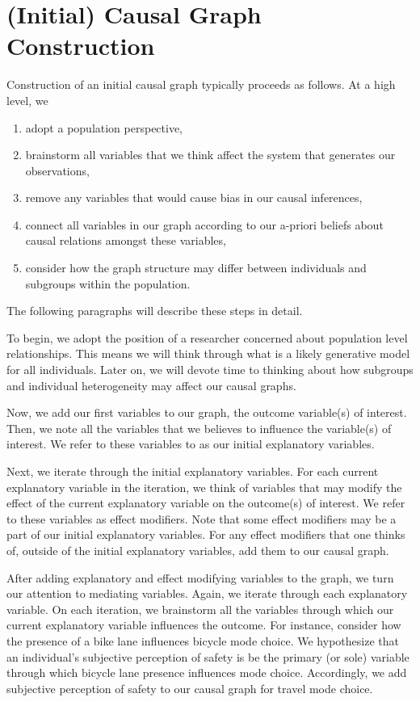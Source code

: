 \section{(Initial) Causal Graph Construction}
\label{sec:graph-construction}

Construction of an initial causal graph typically proceeds as follows.
At a high level, we
\begin{enumerate}
   \item adopt a population perspective,
   \item brainstorm all variables that we think affect the system that generates our observations,
   \item remove any variables that would cause bias in our causal inferences,
   \item connect all variables in our graph according to our a-priori beliefs about causal relations amongst these variables,
   \item consider how the graph structure may differ between individuals and subgroups within the population.
\end{enumerate}
The following paragraphs will describe these steps in detail.

To begin, we adopt the position of a researcher concerned about population level relationships.
This means we will think through what is a likely generative model for all individuals.
Later on, we will devote time to thinking about how subgroups and individual heterogeneity may affect our causal graphs.

Now, we add our first variables to our graph, the outcome variable(s) of interest.
Then, we note all the variables that we believes to influence the variable(s) of interest.
We refer to these variables to as our initial explanatory variables.

Next, we iterate through the initial explanatory variables.
For each current explanatory variable in the iteration, we think of variables that may modify the effect of the current explanatory variable on the outcome(s) of interest.
We refer to these variables as effect modifiers.
Note that some effect modifiers may be a part of our initial explanatory variables.
For any effect modifiers that one thinks of, outside of the initial explanatory variables, add them to our causal graph.

After adding explanatory and effect modifying variables to the graph, we turn our attention to mediating variables.
Again, we iterate through each explanatory variable.
On each iteration, we brainstorm all the variables through which our current explanatory variable influences the outcome.
For instance, consider how the presence of a bike lane influences bicycle mode choice.
We hypothesize that an individual's subjective perception of safety is be the primary (or sole) variable through which bicycle lane presence influences mode choice.
Accordingly, we add subjective perception of safety to our causal graph for travel mode choice.

